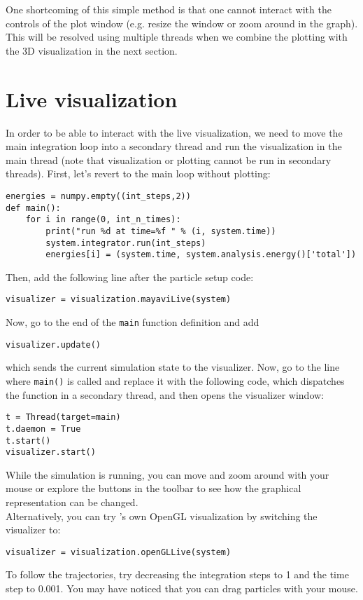 \documentclass[
paper=a4,                       %
fontsize=11pt,                  %
twoside,                        %
footsepline,                    %
headsepline,                    %
headinclude=false,              %
footinclude=false,              %
pagesize,                       %
]{scrartcl}
\begin{document}
\noindent One shortcoming of this simple method is that one cannot interact with the controls of the plot window (e.g. resize the window or zoom around in the graph).
This will be resolved using multiple threads when we combine the plotting with the 3D visualization in the next section.

\section{Live visualization}
\label{vis}

In order to be able to interact with the live visualization, we need to move the main integration loop into a secondary thread and run the visualization in the main thread (note that visualization or plotting cannot be run in secondary threads). First, let's revert to the main loop without plotting:
\begin{lstlisting}
energies = numpy.empty((int_steps,2))
def main():
    for i in range(0, int_n_times):
        print("run %d at time=%f " % (i, system.time))
        system.integrator.run(int_steps)
        energies[i] = (system.time, system.analysis.energy()['total'])
\end{lstlisting}

Then, add the following line after the particle setup code:
\begin{lstlisting}
visualizer = visualization.mayaviLive(system)
\end{lstlisting}
Now, go to the end of the \lstinline{main} function definition and add
\begin{lstlisting}
visualizer.update()
\end{lstlisting}
which sends the current simulation state to the visualizer.
Now, go to the line where \lstinline{main()} is called and replace it with the following code, which dispatches the function in a secondary thread, and then opens the visualizer window:
\begin{lstlisting}
t = Thread(target=main)
t.daemon = True
t.start()
visualizer.start()
\end{lstlisting}
While the simulation is running, you can move and zoom around with your mouse or explore the buttons in the toolbar to see how the graphical representation can be changed.\\

\noindent Alternatively, you can try \es's own OpenGL visualization by switching the visualizer to:
\begin{lstlisting}
visualizer = visualization.openGLLive(system)
\end{lstlisting}
To follow the trajectories, try decreasing the integration steps to 1 and the time step to 0.001. 
You may have noticed that you can drag particles with your mouse. 
\end{document}
